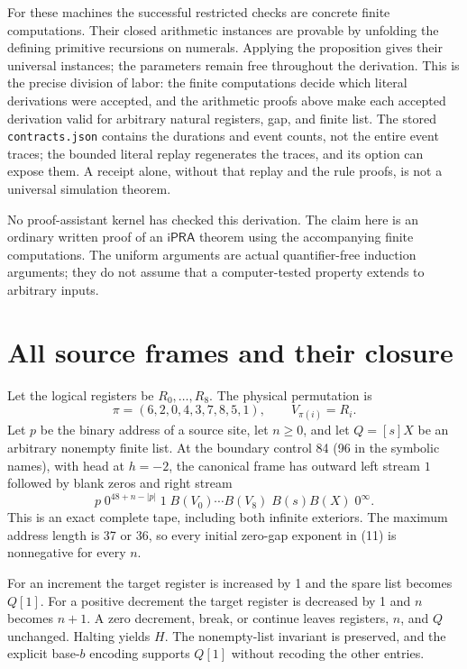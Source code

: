 \documentclass[11pt]{article}
\newcommand{\ipra}{\mathsf{iPRA}}
\begin{document}
For these machines the successful restricted checks are concrete finite
computations.  Their closed arithmetic instances are provable by
unfolding the defining primitive recursions on numerals.  Applying the
proposition gives their universal instances; the parameters remain free
throughout the derivation.  This is the precise division of labor:
the finite computations decide which literal derivations were accepted,
and the arithmetic proofs above make each accepted derivation valid for
arbitrary natural registers, gap, and finite list.  The stored
\texttt{contracts.json} contains the durations and event counts, not
the entire event traces; the bounded literal replay regenerates the
traces, and its  option can expose them.  A receipt
alone, without that replay and the rule proofs, is not a universal
simulation theorem.

No proof-assistant kernel has checked this derivation.  The claim here
is an ordinary written proof of an $\ipra$ theorem using the accompanying
finite computations.  The uniform arguments are actual quantifier-free
induction arguments; they do not assume that a computer-tested property
extends to arbitrary inputs.

\section{All source frames and their closure}

Let the logical registers be $R_0,\ldots,R_8$.  The physical permutation
is
\[
 \pi=(6,2,0,4,3,7,8,5,1),\qquad V_{\pi(i)}=R_i.                 \tag{10}
\]
Let $p$ be the binary address of a source site, let $n\geq0$, and let
$Q=[s]X$ be an arbitrary nonempty finite list.  At the boundary control
84 (96 in the symbolic names), with head at $h=-2$, the canonical frame
has outward left stream $1$ followed by blank zeros and right stream
\[
 p\;0^{48+n-|p|}\;1\;
 B(V_0)\cdots B(V_8)\; B(s)B(X)\;0^\infty.                     \tag{11}
\]
This is an exact complete tape, including both infinite exteriors.
The maximum address length is 37 or 36, so every initial zero-gap
exponent in (11) is nonnegative for every $n$.

For an increment the target register is increased by 1 and the spare
list becomes $Q[1]$.  For a positive decrement the target register is
decreased by 1 and $n$ becomes $n+1$.  A zero decrement, break, or
continue leaves registers, $n$, and $Q$ unchanged.  Halting yields $H$.
The nonempty-list invariant is preserved, and the explicit base-$b$
encoding supports $Q[1]$ without recoding the other entries.
\end{document}
